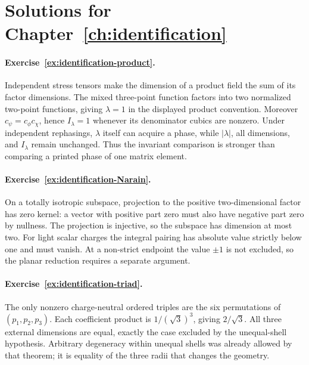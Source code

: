 \section{Solutions for Chapter~\ref{ch:identification}}

\paragraph{Exercise~\ref{ex:identification-product}.}
\label{sol:ex:identification-product}
Independent stress tensors make the dimension of a product
field the sum of its factor dimensions. The mixed three-point
function factors into two normalized two-point functions,
giving $\lambda=1$ in the displayed product convention.
Moreover $c_\psi=c_\phi c_\chi$, hence $I_\lambda=1$ whenever
its denominator cubics are nonzero.
Under independent rephasings, $\lambda$ itself can acquire a
phase, while $|\lambda|$, all dimensions, and $I_\lambda$
remain unchanged. Thus the invariant comparison is stronger
than comparing a printed phase of one matrix element.



\paragraph{Exercise~\ref{ex:identification-Narain}.}
\label{sol:ex:identification-Narain}
On a totally isotropic subspace, projection to the positive
two-dimensional factor has zero kernel: a vector with positive
part zero must also have negative part zero by nullness. The
projection is injective, so the subspace has dimension at most
two. For light scalar charges the integral pairing has absolute
value strictly below one and must vanish. At a non-strict
endpoint the value $\pm1$ is not excluded, so the planar
reduction requires a separate argument.



\paragraph{Exercise~\ref{ex:identification-triad}.}
\label{sol:ex:identification-triad}
The only nonzero charge-neutral ordered triples are the six
permutations of $(p_1,p_2,p_3)$. Each coefficient product is
$1/(\sqrt3)^3$, giving $2/\sqrt3$. All three external dimensions
are equal, exactly the case excluded by the unequal-shell
hypothesis. Arbitrary degeneracy within unequal shells was
already allowed by that theorem; it is equality of the three
radii that changes the geometry.



